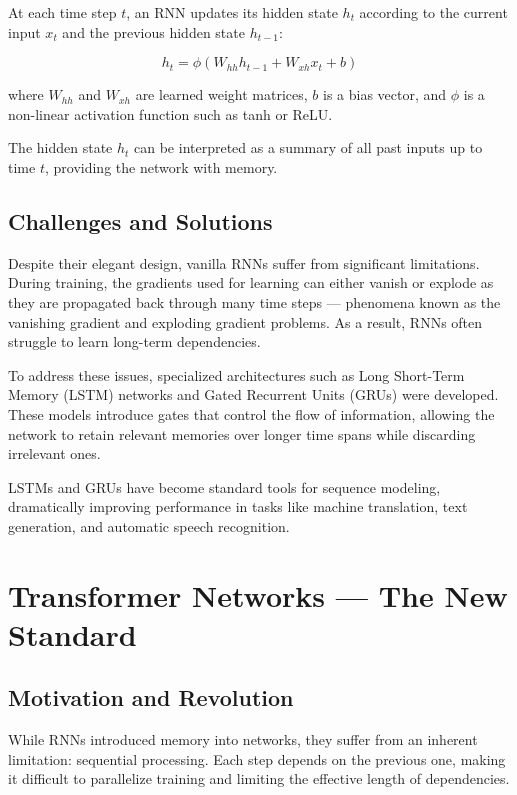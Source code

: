 \documentclass[openany]{book}
\begin{document}
At each time step $t$, an RNN updates its hidden state $h_t$ according to the 
current input $x_t$ and the previous hidden state $h_{t-1}$:

\begin{equation}
h_t = \phi(W_{hh}h_{t-1} + W_{xh}x_t + b)
\end{equation}

where $W_{hh}$ and $W_{xh}$ are learned weight matrices, $b$ is a bias vector, 
and $\phi$ is a non-linear activation function such as tanh or ReLU.

The hidden state $h_t$ can be interpreted as a summary of all past inputs up to 
time $t$, providing the network with memory.

\subsection{Challenges and Solutions}

Despite their elegant design, vanilla RNNs suffer from significant limitations. 
During training, the gradients used for learning can either vanish or explode as 
they are propagated back through many time steps — phenomena known as the 
vanishing gradient and exploding gradient problems. As a result, RNNs often 
struggle to learn long-term dependencies.

To address these issues, specialized architectures such as Long Short-Term 
Memory (LSTM) networks and Gated Recurrent Units (GRUs) were developed. These
models introduce gates that control the flow of information, allowing the 
network to retain relevant memories over longer time spans while discarding 
irrelevant ones.

LSTMs and GRUs have become standard tools for sequence modeling, dramatically 
improving performance in tasks like machine translation, text generation, and 
automatic speech recognition.

\section{Transformer Networks — The New Standard}

\subsection{Motivation and Revolution}

While RNNs introduced memory into networks, they suffer from an inherent 
limitation: sequential processing. Each step depends on the previous one, making
it difficult to parallelize training and limiting the effective length of 
dependencies.
\end{document}
